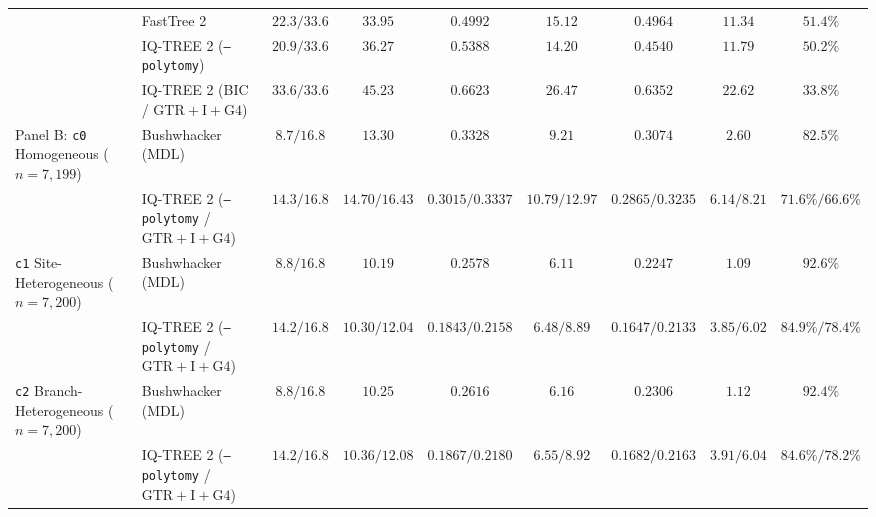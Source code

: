 \documentclass[12pt]{article}
\begin{document}
\begin{table}[H]
{\begin{tabular}{@{}llccccccc@{}}
& FastTree 2 & $22.3 / 33.6$ & $33.95$ & $0.4992$ & $15.12$ & $0.4964$ & $11.34$ & $51.4\%$ \\
& IQ-TREE 2 (\texttt{--polytomy}) & $20.9 / 33.6$ & $36.27$ & $0.5388$ & $14.20$ & $0.4540$ & $11.79$ & $50.2\%$ \\
& IQ-TREE 2 (BIC / $\text{GTR}+\text{I}+\text{G4}$) & $33.6 / 33.6$ & $45.23$ & $0.6623$ & $26.47$ & $0.6352$ & $22.62$ & $33.8\%$ \\
\midrule
Panel B: \texttt{c0} Homogeneous ($n=7,199$) & Bushwhacker (MDL) & $8.7 / 16.8$ & $13.30$ & $0.3328$ & $9.21$ & $0.3074$ & $2.60$ & $82.5\%$ \\
& IQ-TREE 2 (\texttt{--polytomy} / $\text{GTR}+\text{I}+\text{G4}$) & $14.3 / 16.8$ & $14.70 / 16.43$ & $0.3015 / 0.3337$ & $10.79 / 12.97$ & $0.2865 / 0.3235$ & $6.14 / 8.21$ & $71.6\% / 66.6\%$ \\
\texttt{c1} Site-Heterogeneous ($n=7,200$) & Bushwhacker (MDL) & $8.8 / 16.8$ & $10.19$ & $0.2578$ & $6.11$ & $0.2247$ & $1.09$ & $92.6\%$ \\
& IQ-TREE 2 (\texttt{--polytomy} / $\text{GTR}+\text{I}+\text{G4}$) & $14.2 / 16.8$ & $10.30 / 12.04$ & $0.1843 / 0.2158$ & $6.48 / 8.89$ & $0.1647 / 0.2133$ & $3.85 / 6.02$ & $84.9\% / 78.4\%$ \\
\texttt{c2} Branch-Heterogeneous ($n=7,200$) & Bushwhacker (MDL) & $8.8 / 16.8$ & $10.25$ & $0.2616$ & $6.16$ & $0.2306$ & $1.12$ & $92.4\%$ \\
& IQ-TREE 2 (\texttt{--polytomy} / $\text{GTR}+\text{I}+\text{G4}$) & $14.2 / 16.8$ & $10.36 / 12.08$ & $0.1867 / 0.2180$ & $6.55 / 8.92$ & $0.1682 / 0.2163$ & $3.91 / 6.04$ & $84.6\% / 78.2\%$ \\
\bottomrule
\end{tabular}%
}
\end{table}
\end{document}
